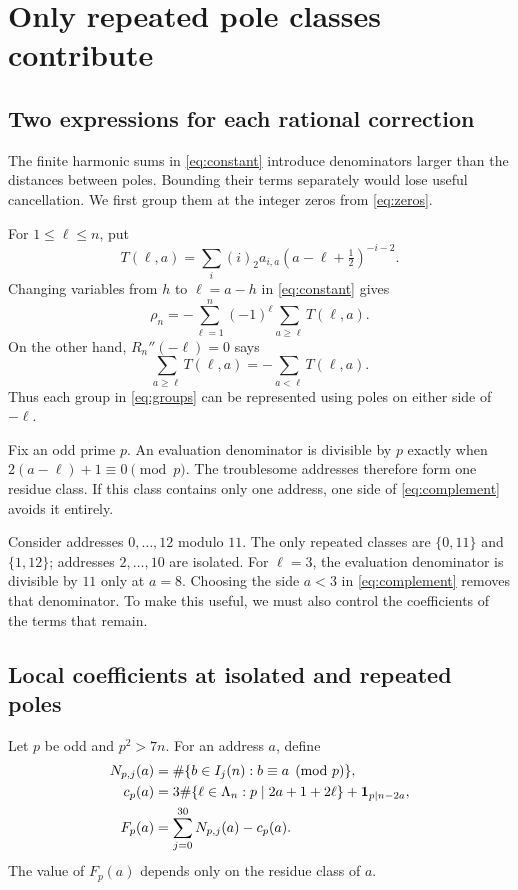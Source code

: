 \section{Only repeated pole classes contribute}\label{sec:denominators}
\subsection{Two expressions for each rational correction}
The finite harmonic sums in \eqref{eq:constant} introduce denominators
larger than the distances between poles. Bounding their terms separately
would lose useful cancellation. We first group them at the integer
zeros from \eqref{eq:zeros}.

For $1\le\ell\le n$, put
\[
 T(\ell,a)=\sum_i(i)_2a_{i,a}
                         (a-\ell+\tfrac12)^{-i-2}.
\]
Changing variables from $h$ to $\ell=a-h$ in \eqref{eq:constant}
gives
\begin{equation}\label{eq:groups}
 \rho_n=-\sum_{\ell=1}^{n}(-1)^\ell
                               \sum_{a\ge\ell}T(\ell,a).
\end{equation}
On the other hand, $R_n''(-\ell)=0$ says
\begin{equation}\label{eq:complement}
 \sum_{a\ge\ell}T(\ell,a)=-\sum_{a<\ell}T(\ell,a).
\end{equation}
Thus each group in \eqref{eq:groups} can be represented using poles
on either side of $-\ell$.

Fix an odd prime $p$. An evaluation denominator is divisible by $p$
exactly when $2(a-\ell)+1\equiv0\pmod p$. The troublesome addresses
therefore form one residue class. If this class contains only one
address, one side of \eqref{eq:complement} avoids it entirely.

\begin{example}\label{ex:isolated}
Consider addresses $0,\ldots,12$ modulo $11$. The only repeated
classes are $\{0,11\}$ and $\{1,12\}$; addresses $2,\ldots,10$
are isolated. For $\ell=3$, the evaluation denominator is divisible
by $11$ only at $a=8$. Choosing the side $a<3$ in
\eqref{eq:complement} removes that denominator. To make this useful,
we must also control the coefficients of the terms that remain.
\end{example}

\subsection{Local coefficients at isolated and repeated poles}
Let $p$ be odd and $p^2>7n$. For an address $a$, define
\begin{align*}
 N_{p,j}(a)&=\#\{b\in I_j(n):b\equiv a\pmod p\},\\
 c_p(a)&=3\#\{\ell\in\Lambda_n:p\mid2a+1+2\ell\}
                              +\mathbf 1_{p\mid n-2a},\\
 F_p(a)&=\sum_{j=0}^{30}N_{p,j}(a)-c_p(a).
\end{align*}
The value of $F_p(a)$ depends only on the residue class of $a$.

